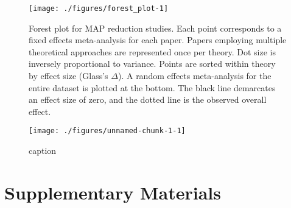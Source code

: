 \documentclass[sn-nature,referee,pdflatex]{sn-jnl}
\begin{document}
\begin{figure}[H]

{\centering \texttt{[image: ./figures/forest\_plot-1]} 

}

\caption{Forest plot for MAP reduction studies. Each point corresponds to a fixed effects meta-analysis for each paper. Papers employing multiple theoretical approaches are represented once per theory. Dot size is inversely proportional to variance. Points are sorted within theory by effect size (Glass's $\Delta$). A random effects meta-analysis for the entire dataset is plotted at the bottom. The black line demarcates an effect size of zero, and the dotted line is the observed overall effect.}\label{fig:forest_plot}
\end{figure}

\begin{figure}
\texttt{[image: ./figures/unnamed-chunk-1-1]} \caption{caption}\label{fig:unnamed-chunk-1}
\end{figure}

\newpage

\section{Supplementary Materials}\label{supplementary-materials}

\renewcommand\refname{References}

\end{document}
